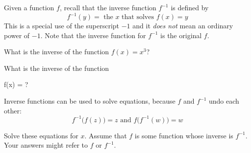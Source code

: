 
Given a function $f$, recall that the inverse function $f^{-1}$ is defined by
\begin{equation*}
 f^{-1}(y) = \text{ the $x$ that solves } f(x) = y
\end{equation*}
This is a special use of the superscript $-1$ and it \emph{does not} mean an ordinary power of $-1$.
Note that the inverse function for $f^{-1}$ is the original $f$.

\begin{ProblemSet}
 \begin{Problem}
  What is the inverse of the function $f(x) = x^3$?
 \end{Problem}
 \begin{Problem}
  What is the inverse of the function
  \begin{LeftEquation}
   f(x) = ?
  \end{LeftEquation}
 \end{Problem}
\end{ProblemSet}

Inverse functions can be used to solve equations, because
$f$ and $f^{-1}$ undo each other:
\begin{equation*}
 f^{-1}\big( f(z) \big) = z
 \text{ and }
 f\big( f^{-1}(w) \big) = w
\end{equation*}

Solve these equations for $x$.
Assume that $f$ is some function whose inverse is $f^{-1}$.
Your answers might refer to $f$ or $f^{-1}$.
\begin{ProblemSet}[pencil space=2.5in]
\end{ProblemSet}

